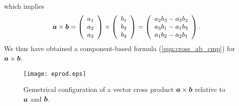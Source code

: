 \documentclass[10pt,a4j]{article}
\begin{document}
which implies 
\begin{equation}
	\mbox{\boldmath $a$}\times \mbox{\boldmath $b$}
	=
	\left(
		\begin{array}{c}
			a_1 \\
			a_2 \\ 
			a_3 
		\end{array}
	\right)
	\times
	\left(
		\begin{array}{c}
			b_1 \\
			b_2 \\ 
			b_3 
		\end{array}
	\right)
	=
	\left(
		\begin{array}{c}
			a_2b_3-a_3b_2 \\

			a_3b_1-a_1b_3 \\ 
			a_1b_2-a_2b_1
		\end{array}
	\right)
	\label{eqn:cross_ab_cmp}.
\end{equation}
We thus have obtained a component-based formula (\ref{eqn:cross_ab_cmp}) for $\mbox{\boldmath $a$}\times\mbox{\boldmath $b$}$.
\begin{figure}[h]
	\begin{center}
	\texttt{[image: eprod.eps]} 
	\end{center}
	\caption{Gemetrical configuration of a vector cross product 
	$\mbox{\boldmath $a$}\times\mbox{\boldmath $b$}$ relative to $\mbox{\boldmath $a$}$ and $\mbox{\boldmath $b$}$.} 
	\label{fig:fig1_6}
\end{figure}
\end{document}
